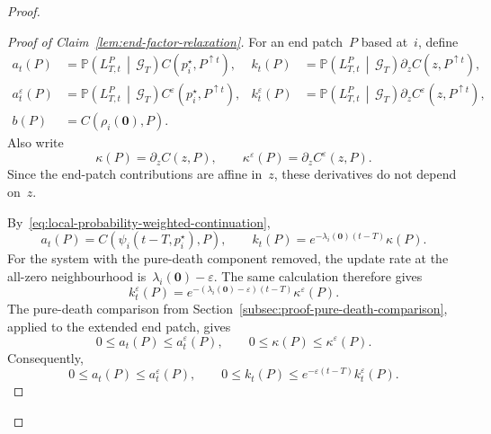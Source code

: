 \documentclass[EJP,preprint,NODS,nobera]{ejpecp}
\newcommand{\pP}{\mathbb{P}}
\newcommand{\CP}[2]{\pP\bb{#1\,\middle|\,#2}}
\newcommand{\bb}[1]{\left(#1\right)}
\newcommand{\mb}[1]{\mathbf{#1}}
\begin{document}
\begin{proof}
\begin{proof}[Proof of Claim~\ref{lem:end-factor-relaxation}]
For an end patch~$P$ based at~$i$, define
\begin{align*}
a_t(P)
&=
\CP{L_{T,t}^P}{\mathcal G_T}
C\bb{p_i^\star,P^{\uparrow t}},
&
k_t(P)
&=
\CP{L_{T,t}^P}{\mathcal G_T}
\partial_z C\bb{z,P^{\uparrow t}},
\\
a_t^\varepsilon(P)
&=
\CP{L_{T,t}^P}{\mathcal G_T}
C^\varepsilon\bb{p_i^\star,P^{\uparrow t}},
&
k_t^\varepsilon(P)
&=
\CP{L_{T,t}^P}{\mathcal G_T}
\partial_z C^\varepsilon\bb{z,P^{\uparrow t}},
\\
b(P)
&=
C\bb{\rho_i(\mb 0),P}.
\end{align*}
Also write
\begin{equation*}
\kappa(P)=\partial_zC(z,P),
\qquad
\kappa^\varepsilon(P)=\partial_zC^\varepsilon(z,P).
\end{equation*}
Since the end-patch contributions are affine in~$z$, these derivatives do not
depend on~$z$.

By~\eqref{eq:local-probability-weighted-continuation},
\begin{equation}
\label{eq:continued-end-factor-data}
a_t(P)
=
C\bb{\psi_i(t-T,p_i^\star),P},
\qquad
k_t(P)
=
e^{-\lambda_i(\mb 0)(t-T)}\kappa(P).
\end{equation}
For the system with the pure-death component removed, the update rate at the
all-zero neighbourhood is~$\lambda_i(\mb 0)-\varepsilon$. The same calculation
therefore gives
\begin{equation*}
k_t^\varepsilon(P)
=
e^{-\bb{\lambda_i(\mb 0)-\varepsilon}(t-T)}
\kappa^\varepsilon(P).
\end{equation*}
The pure-death comparison from
Section~\ref{subsec:proof-pure-death-comparison}, applied to the extended end
patch, gives
\begin{equation*}
0\leq a_t(P)\leq a_t^\varepsilon(P),
\qquad
0\leq\kappa(P)\leq\kappa^\varepsilon(P).
\end{equation*}
Consequently,
\begin{equation}
\label{eq:appendix-continued-factor-comparisons}
0\leq a_t(P)\leq a_t^\varepsilon(P),
\qquad
0\leq k_t(P)\leq e^{-\varepsilon(t-T)}k_t^\varepsilon(P).
\end{equation}


\end{proof}
\end{proof}
\end{document}

